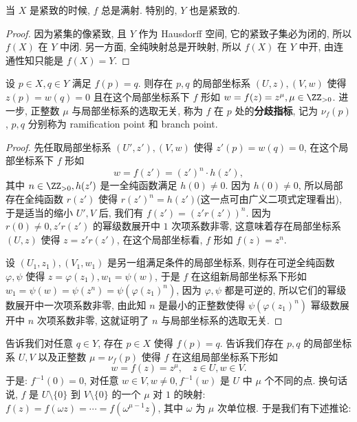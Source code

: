 \begin{lem}
\label{lem:surjective}
当 $X$ 是紧致的时候, $f$ 总是满射. 特别的, $Y$ 也是紧致的.
\end{lem}

\begin{proof}
因为紧集的像紧致, 且 $Y$ 作为 Hausdorff 空间, 它的紧致子集必为闭的,
所以 $f(X)$ 在 $Y$ 中闭.
另一方面, 全纯映射总是开映射, 所以 $f(X)$ 在 $Y$ 中开,
由连通性知只能是 $f(X) = Y$.
\end{proof}

\begin{prop}[分歧指标]
\label{prop:ramification-index}
设 $p \in X, q \in Y$ 满足 $f(p) = q$.
则存在 $p,q$ 的局部坐标系 $(U,z), (V,w)$ 使得
$z(p) = w(q) = 0$ 且在这个局部坐标系下 $f$ 形如 $w = f(z) = z^\mu, \mu \in \ZZ_{>0}$.
进一步, 正整数 $\mu$ 与局部坐标系的选取无关,
称为 $f$ 在 $p$ 处的\textbf{分歧指标}, 记为 $\nu_f(p)$,
$p,q$ 分别称为 ramification point 和 branch point.
\end{prop}

\begin{proof}
先任取局部坐标系 $(U',z'), (V,w)$ 使得 $z'(p) = w(q) = 0$,
在这个局部坐标系下 $f$ 形如
\[w = f(z') = (z')^n\cdot h(z'),\]
其中 $n \in \ZZ_{>0}, h(z')$ 是一全纯函数满足 $h(0) \ne 0$.
因为 $h(0) \ne 0$,
所以局部存在全纯函数 $r(z')$ 使得 $r(z')^n = h(z')$(这一点可由广义二项式定理看出),
于是适当的缩小 $U', V$ 后, 我们有 $f(z') = (z'r(z'))^n$.
因为 $r(0) \ne 0, z'r(z')$ 的幂级数展开中 $1$ 次项系数非零,
这意味着存在局部坐标系 $(U,z)$ 使得 $z = z'r(z')$,
在这个局部坐标看, $f$ 形如 $f(z) = z^n$.

设 $(U_1,z_1), (V_1, w_1)$ 是另一组满足条件的局部坐标系,
则存在可逆全纯函数 $\varphi, \psi$ 使得 $z = \varphi(z_1), w_1 = \psi(w)$,
于是 $f$ 在这组新局部坐标系下形如
$w_1 = \psi(w) = \psi(z^n) = \psi(\varphi(z_1)^n)$,
因为 $\varphi, \psi$ 都是可逆的, 所以它们的幂级数展开中一次项系数非零,
由此知 $n$ 是最小的正整数使得
$\psi(\varphi(z_1)^n)$ 幂级数展开中 $n$ 次项系数非零,
这就证明了 $n$ 与局部坐标系的选取无关.
\end{proof}

 告诉我们对任意 $q \in Y$,
存在 $p \in X$ 使得 $f(p) = q$.
 告诉我们存在 $p,q$ 的局部坐标系 $U,V$
以及正整数 $\mu = \nu_f(p)$ 使得
$f$ 在这组局部坐标系下形如
\begin{equation}
\label{eq:ramification-local-representation}
w = f(z) = z^\mu, \quad z \in U, w \in V.
\end{equation}
于是: $f^{-1}(0) = 0$,
对任意 $w \in V, w \ne 0, f^{-1}(w)$ 是 $U$ 中 $\mu$ 个不同的点.
换句话说, $f$ 是 $U\setminus \{0\}$ 到 $V\setminus \{0\}$ 的一个 $\mu$ 对 $1$ 的映射:
$f(z) = f(\omega z) = \cdots = f(\omega^{\mu - 1}z)$,
其中 $\omega$ 为 $\mu$ 次单位根.
于是我们有下述推论:

